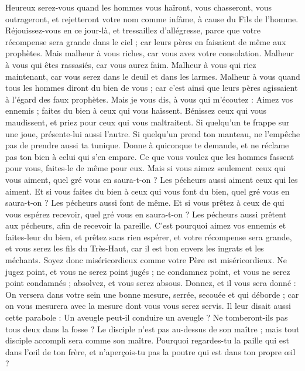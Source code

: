 \begin{multicols}{2}
Heureux serez-vous quand les hommes vous haïront, vous chasseront, vous outrageront, et rejetteront votre nom comme infâme, à cause du Fils de l'homme.
Réjouissez-vous en ce jour-là, et tressaillez d’allégresse, parce que votre récompense sera grande dans le ciel ; car leurs pères en faisaient de même aux prophètes.
Mais malheur à vous riches, car vous avez votre consolation.
Malheur à vous qui êtes rassasiés, car vous aurez faim. Malheur à vous qui riez maintenant, car vous serez dans le deuil et dans les larmes.
Malheur à vous quand tous les hommes diront du bien de vous ; car c’est ainsi que leurs pères agissaient à l’égard des faux prophètes.
Mais je vous dis, à vous qui m’écoutez : Aimez vos ennemis ; faites du bien à ceux qui vous haïssent.
Bénissez ceux qui vous maudissent, et priez pour ceux qui vous maltraitent.
Si quelqu’un te frappe sur une joue, présente-lui aussi l'autre. Si quelqu'un prend ton manteau, ne l'empêche pas de prendre aussi ta tunique.
Donne à quiconque te demande, et ne réclame pas ton bien à celui qui s’en empare.
Ce que vous voulez que les hommes fassent pour vous, faites-le de même pour eux.
Mais si vous aimez seulement ceux qui vous aiment, quel gré vous en saura-t-on ? Les pécheurs aussi aiment ceux qui les aiment.
Et si vous faites du bien à ceux qui vous font du bien, quel gré vous en saura-t-on ? Les pécheurs aussi font de même.
Et si vous prêtez à ceux de qui vous espérez recevoir, quel gré vous en saura-t-on ? Les pécheurs aussi prêtent aux pécheurs, afin de recevoir la pareille.
C'est pourquoi aimez vos ennemis et faites-leur du bien, et prêtez sans rien espérer, et votre récompense sera grande, et vous serez les fils du Très-Haut, car il est bon envers les ingrats et les méchants.
Soyez donc miséricordieux comme votre Père est miséricordieux.
Ne jugez point, et vous ne serez point jugés ; ne condamnez point, et vous ne serez point condamnés ; absolvez, et vous serez absous.
Donnez, et il vous sera donné : On versera dans votre sein une bonne mesure, serrée, secouée et qui déborde ; car on vous mesurera avec la mesure dont vous vous serez servis.
Il leur disait aussi cette parabole : Un aveugle peut-il conduire un aveugle ? Ne tomberont-ils pas tous deux dans la fosse ?
Le disciple n'est pas au-dessus de son maître ; mais tout disciple accompli sera comme son maître.
Pourquoi regardes-tu la paille qui est dans l’œil de ton frère, et n’aperçois-tu pas la poutre qui est dans ton propre œil ?

\end{multicols}
